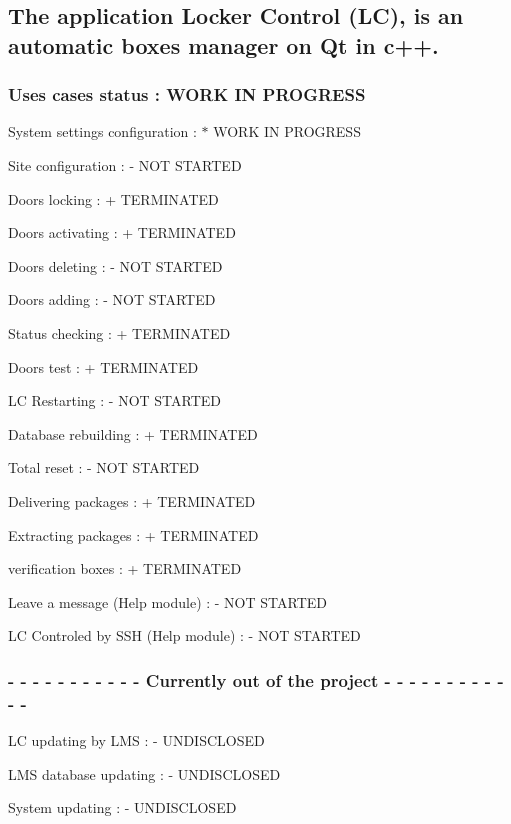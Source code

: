 \subsection*{The application Locker Control (L\+C), is an automatic boxes manager on Qt in c++.}

\subsubsection*{Uses cases status \+: W\+O\+R\+K I\+N P\+R\+O\+G\+R\+E\+S\+S}


\begin{DoxyItemize}
\item System settings configuration \+: $\ast$ W\+O\+R\+K I\+N P\+R\+O\+G\+R\+E\+S\+S
\item Site configuration \+: -\/ N\+O\+T S\+T\+A\+R\+T\+E\+D
\item Doors locking \+: + T\+E\+R\+M\+I\+N\+A\+T\+E\+D
\item Doors activating \+: + T\+E\+R\+M\+I\+N\+A\+T\+E\+D
\item Doors deleting \+: -\/ N\+O\+T S\+T\+A\+R\+T\+E\+D
\item Doors adding \+: -\/ N\+O\+T S\+T\+A\+R\+T\+E\+D
\item Status checking \+: + T\+E\+R\+M\+I\+N\+A\+T\+E\+D
\item Doors test \+: + T\+E\+R\+M\+I\+N\+A\+T\+E\+D
\item L\+C Restarting \+: -\/ N\+O\+T S\+T\+A\+R\+T\+E\+D
\item Database rebuilding \+: + T\+E\+R\+M\+I\+N\+A\+T\+E\+D
\item Total reset \+: -\/ N\+O\+T S\+T\+A\+R\+T\+E\+D
\item Delivering packages \+: + T\+E\+R\+M\+I\+N\+A\+T\+E\+D
\item Extracting packages \+: + T\+E\+R\+M\+I\+N\+A\+T\+E\+D
\item verification boxes \+: + T\+E\+R\+M\+I\+N\+A\+T\+E\+D
\item Leave a message (Help module) \+: -\/ N\+O\+T S\+T\+A\+R\+T\+E\+D
\item L\+C Controled by S\+S\+H (Help module) \+: -\/ N\+O\+T S\+T\+A\+R\+T\+E\+D
\end{DoxyItemize}

\subsubsection*{-\/ -\/ -\/ -\/ -\/ -\/ -\/ -\/ -\/ -\/ -\/ Currently out of the project -\/ -\/ -\/ -\/ -\/ -\/ -\/ -\/ -\/ -\/ -\/ -\/}


\begin{DoxyItemize}
\item L\+C updating by L\+M\+S \+: -\/ U\+N\+D\+I\+S\+C\+L\+O\+S\+E\+D
\item L\+M\+S database updating \+: -\/ U\+N\+D\+I\+S\+C\+L\+O\+S\+E\+D
\item System updating \+: -\/ U\+N\+D\+I\+S\+C\+L\+O\+S\+E\+D 
\end{DoxyItemize}